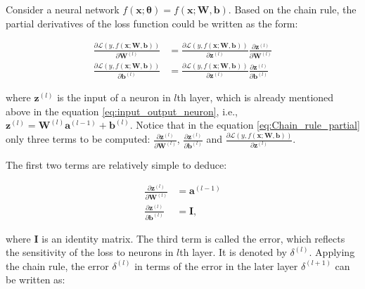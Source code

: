 \documentclass[
	parskip, 			   %
	twoside, 			   %
	DIV=14, 			   %
	BCOR=15.0mm, 		   %
	headsepline, 		   %
	open=right, 		   %
	captions=tableheading, %
	bibliography=totoc,    %
	numbers=noenddot       %
]{scrreprt}
\begin{document}
Consider a neural network $f(\mathbf{x};\mathbf{\theta})=f(\mathbf{x};\mathbf{W},\mathbf{b})$. Based on the chain rule, the partial derivatives of the loss function could be written as the form:

\begin{equation}
    \label{eq:Chain_rule_partial}
    \begin{aligned}
        \frac{\partial \mathcal{L}\left( y,f(\mathbf{x};\mathbf{\mathbf{W},\mathbf{b}}) \right)}{\partial \mathbf{W}^{(l)}} &= \frac{\partial \mathcal{L}\left( y,f(\mathbf{x};\mathbf{\mathbf{W},\mathbf{b}}) \right)}{\partial \mathbf{z}^{(l)}} 
        \frac{\partial \mathbf{z}^{(l)}}{\partial \mathbf{W}^{(l)}}
        \\
        \frac{\partial \mathcal{L}\left( y,f(\mathbf{x};\mathbf{\mathbf{W},\mathbf{b}}) \right)}{\partial \mathbf{b}^{(l)}} &= \frac{\partial \mathcal{L}\left( y,f(\mathbf{x};\mathbf{\mathbf{W},\mathbf{b}}) \right)}{\partial \mathbf{z}^{(l)}}
        \frac{\partial \mathbf{z}^{(l)}}{\partial \mathbf{b}^{(l)}}
    \end{aligned}
\end{equation}

where $\mathbf{z}^{(l)}$ is the input of a neuron in $l$th layer, which is already mentioned above in the equation \ref{eq:input_output_neuron}, i.e., $\mathbf{z}^{(l)} = \mathbf{W}^{(l)} \mathbf{a}^{(l-1)} + \mathbf{b}^{(l)}$. Notice that in the equation \ref{eq:Chain_rule_partial} only three terms to be computed: $\frac{\partial \mathbf{z}^{(l)}}{\partial \mathbf{W}^{(l)}}$, $\frac{\partial \mathbf{z}^{(l)}}{\partial \mathbf{b}^{(l)}}$ and $\frac{\partial \mathcal{L}\left( y,f(\mathbf{x};\mathbf{\mathbf{W},\mathbf{b}}) \right)}{\partial \mathbf{z}^{(l)}}$.

The first two terms are relatively simple to deduce:

\begin{equation}
    \label{eq:two_terms}
    \begin{aligned}
        \frac{\partial \mathbf{z}^{(l)}}{\partial \mathbf{W}^{(l)}} &= \mathbf{a}^{(l-1)}
        \\
        \frac{\partial \mathbf{z}^{(l)}}{\partial \mathbf{b}^{(l)}} &= \mathbf{I},
    \end{aligned}
\end{equation}

where $\mathbf{I}$ is an identity matrix. The third term is called the error, which reflects the sensitivity of the loss to neurons in $l$th layer. It is denoted by $\delta^{(l)}$. Applying the chain rule, the error $\delta^{(l)}$ in terms of the error in the
later layer $\delta^{(l+1)}$ can be written as:
\end{document}
